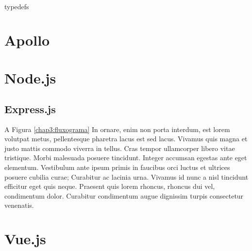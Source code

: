 typedefs


\section{Apollo}

\section{Node.js}

\subsection{Express.js
}
\label{chap3:sec:fluxograma}

A Figura \ref{chap3:fluxograma} In ornare, enim non porta interdum, est lorem volutpat metus, pellentesque pharetra lacus est sed lacus. Vivamus quis magna et justo mattis commodo viverra in tellus. Cras tempor ullamcorper libero vitae tristique. Morbi malesuada posuere tincidunt. Integer accumsan egestas ante eget elementum. Vestibulum ante ipsum primis in faucibus orci luctus et ultrices posuere cubilia curae; Curabitur ac lacinia urna. Vivamus id nunc a nisl tincidunt efficitur eget quis neque. Praesent quis lorem rhoncus, rhoncus dui vel, condimentum dolor. Curabitur condimentum augue dignissim turpis consectetur venenatis.

\section{Vue.js}
